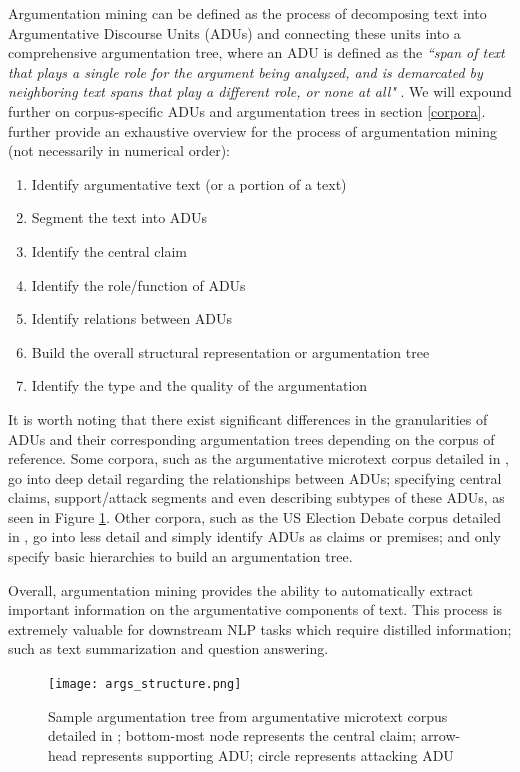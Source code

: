 Argumentation mining can be defined as the process of decomposing text into Argumentative Discourse Units (ADUs) and connecting these units into a comprehensive argumentation tree, where an ADU is defined as the \textit{``span of text that plays a single role for the argument being analyzed, and is demarcated by neighboring text spans that play a different role, or none at all"} \citep{stede2018argumentation}. We will expound further on corpus-specific ADUs and argumentation trees in section \ref{corpora}. \citet{stede2018argumentation} further provide an exhaustive overview for the process of argumentation mining (not necessarily in numerical order):

\begin{enumerate}
    \item Identify argumentative text (or a portion of a text)
    \item Segment the text into ADUs
    \item Identify the central claim
    \item Identify the role/function of ADUs
    \item Identify relations between ADUs
    \item Build the overall structural representation or argumentation tree
    \item Identify the type and the quality of the argumentation
\end{enumerate}

It is worth noting that there exist significant differences in the granularities of ADUs and their corresponding argumentation trees depending on the corpus of reference. Some corpora, such as the argumentative microtext corpus detailed in \citet{peldszus2015annotated}, go into deep detail regarding the relationships between ADUs; specifying central claims, support/attack segments and even describing subtypes of these ADUs, as seen in Figure \ref{args_structure}. Other corpora, such as the US Election Debate corpus detailed in \citet{haddadan-etal-2019-yes}, go into less detail and simply identify ADUs as claims or premises; and only specify basic hierarchies to build an argumentation tree.

Overall, argumentation mining provides the ability to automatically extract important information on the argumentative components of text. This process is extremely valuable for downstream NLP tasks which require distilled information; such as text summarization and question answering.

\begin{figure}[t]
    \centering
    \texttt{[image: args\_structure.png]}
    \caption{Sample argumentation tree from argumentative microtext corpus detailed in \citet{peldszus2015annotated}; bottom-most node represents the central claim; arrow-head represents supporting ADU; circle represents attacking ADU}
    \label{args_structure}
\end{figure}

